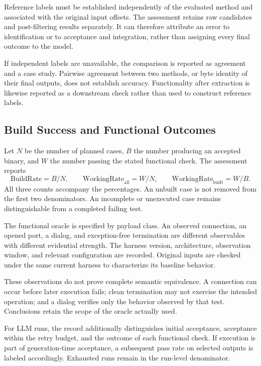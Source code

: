 Reference labels must be established independently of the evaluated
method and associated with the original input offsets. The assessment
retains raw candidates and post-filtering results separately. It can
therefore attribute an error to identification or to acceptance and
integration, rather than assigning every final outcome to the model.

If independent labels are unavailable, the comparison is reported as
agreement and a case study. Pairwise agreement between two methods,
or byte identity of their final outputs, does not establish accuracy.
Functionality after extraction is likewise reported as a downstream
check rather than used to construct reference labels.

\subsection{Build Success and Functional Outcomes}
Let $N$ be the number of planned cases, $B$ the number producing an
accepted binary, and $W$ the number passing the stated functional check.
The assessment reports
\begin{equation}
\mathrm{BuildRate}=B/N,\qquad
\mathrm{WorkingRate}_{\mathrm{all}}=W/N,\qquad
\mathrm{WorkingRate}_{\mathrm{built}}=W/B.
\end{equation}
All three counts accompany the percentages. An unbuilt case is not
removed from the first two denominators. An incomplete or unexecuted
case remains distinguishable from a completed failing test.

The functional oracle is specified by payload class. An observed
connection, an opened port, a dialog, and exception-free termination
are different observables with different evidential strength. The
harness version, architecture, observation window, and relevant
configuration are recorded. Original inputs are checked under the
same current harness to characterize its baseline behavior.

These observations do not prove complete semantic equivalence. A
connection can occur before later execution fails; clean termination
may not exercise the intended operation; and a dialog verifies only
the behavior observed by that test. Conclusions retain the scope of
the oracle actually used.

For LLM runs, the record additionally distinguishes initial acceptance,
acceptance within the retry budget, and the outcome of each functional
check. If execution is part of generation-time acceptance, a subsequent
pass rate on selected outputs is labeled accordingly. Exhausted runs
remain in the run-level denominator.

